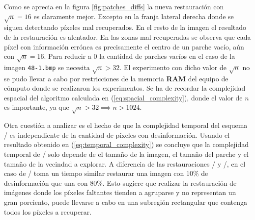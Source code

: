 Como se aprecia en la figura \ref{fig:patches_diffs} la nueva restauraci\'on con $\sqrt{n} = 16$ es claramente mejor. Excepto en la franja lateral derecha donde se siguen detectando p\'ixeles mal recuperados. En el resto de la imagen el resultado de la restauraci\'on es alentador. En las zonas mal recuperadas se observa que cada p\'ixel con informaci\'on errónea es precisamente el centro de un parche vac\'io, a\'un con $\sqrt{n} = 16$. Para reducir a 0 la cantidad de parches vac\'ios en el caso de la imagen \texttt{48-1.bmp} se necesita $\sqrt{n} > 32$. El experimento con dicho valor de $\sqrt{n}$ no se pudo llevar a cabo por restricciones de la memoria \textbf{RAM} del equipo de c\'omputo donde se realizaron los experimentos. Se ha de recordar la complejidad espacial del algoritmo calculada en (\ref{eq:spacial_complexity}), donde el valor de $n$ es importante, ya que $\sqrt{n} > 32 \implies n > 1024$.

Otra cuesti\'on a analizar es el hecho de que la complejidad temporal del esquema \SOP/ es independiente de la cantidad de p\'ixeles con desinformaci\'on. Usando el resultado obtenido en (\ref{eq:temporal_complexity}) se concluye que la complejidad temporal de \SOP/ solo depende de el tamaño de la imagen, el tamaño del parche y el tamaño de la vecindad a explorar. A diferencia de las restauraciones \TELEA/ y \NS/, en el caso de \SOP/ toma un tiempo similar restaurar una imagen con 10\% de desinformaci\'on que una con 80\%. Esto sugiere que realizar la restauraci\'on de im\'agenes donde los p\'ixeles faltantes tienden a agruparse y no representan un gran porciento, puede llevarse a cabo en una subregi\'on rectangular que contenga todos los p\'ixeles a recuperar.

